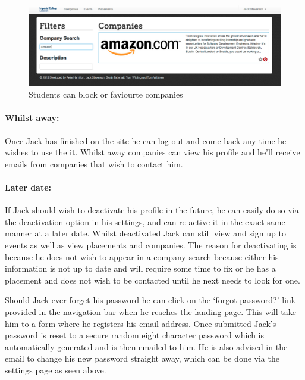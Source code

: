     \begin{figure}[H]\centering
    \includegraphics[scale=0.3]{images/user_experiences/student/block_amazon}
    \caption{Students can block or faviourte companies}
    \end{figure}

  \paragraph{Whilst away:}
    Once Jack has finished on the site he can log out and come back any time he wishes to use the it. Whilst away companies can view his profile and he'll receive emails from companies that wish to contact him.

  \paragraph{Later date:}
    If Jack should wish to deactivate his profile in the future, he can easily do so via the deactivation option in his settings, and can re-active it in the exact same manner at a later date. Whilst deactivated Jack can still view and sign up to events as well as view placements and companies. The reason for deactivating is because he does not wish to appear in a company search because either his information is not up to date and will require some time to fix or he has a placement and does not wish to be contacted until he next needs to look for one.

    Should Jack ever forget his password he can click on the `forgot password?' link provided in the navigation bar when he reaches the landing page. This will take him to a form where he registers his email address. Once submitted Jack's password is reset to a secure random eight character password which is automatically generated and is then emailed to him. He is also advised in the email to change his new password straight away, which can be done via the settings page as seen above.